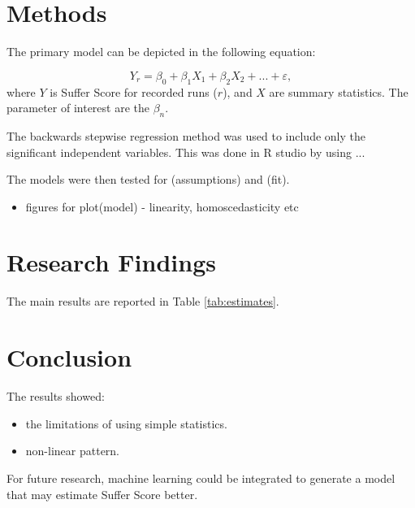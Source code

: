 \documentclass[12pt,english]{article}
\begin{document}
\section{Methods}\label{sec:methods}
The primary model can be depicted in the following equation:

\begin{equation}
\label{eq:1}
Y_r=\beta_{0} + \beta_{1}X_{1} + \beta_{2}X_{2} + ... + \varepsilon,
\end{equation}
where $Y$ is Suffer Score for recorded runs ($r$), and $X$ are summary statistics. The parameter of interest are the $\beta_{n}$.

The backwards stepwise regression method was used to include only the significant independent variables. This was done in R studio by using ...

The models were then tested for (assumptions) and (fit).
\begin{itemize}
    \item figures for plot(model) - linearity, homoscedasticity etc
\end{itemize}

\section{Research Findings}\label{sec:results}
The main results are reported in Table \ref{tab:estimates}.

\section{Conclusion}\label{sec:conclusion}
The results showed: 
\begin{itemize}
    \item the limitations of using simple statistics.
    \item non-linear pattern.
\end{itemize}

For future research, machine learning could be integrated to generate a model that may estimate Suffer Score better.

\vfill
\pagebreak{}
\begin{spacing}{1.0}


\end{spacing}

\vfill
\pagebreak{}
\clearpage

\end{document}
